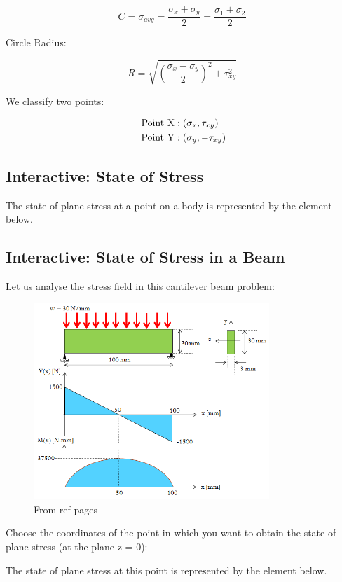 \[C = \sigma_{avg} = \frac{\sigma_x +\sigma_y}{2} = \frac{\sigma_1 +\sigma_2}{2}\]

\noindent Circle Radius:

\[R = \sqrt{(\frac{\sigma_x - \sigma_y}{2})^2 + \tau_{xy}^2}\]

\noindent We classify two points:

\[ \begin{align}
\rm\ Point \ X&: (\sigma_x, \tau_{xy}) \\
\rm\ Point \ Y&: (\sigma_y, -\tau_{xy})
\end{align}\]
                        
\subsection{Interactive: State of Stress}

The state of plane stress at a point on a body is represented by the element below.

\vspace{5pt}

\noindent \textbf{}

\subsection{Interactive: State of Stress in a Beam}

Let us analyse the stress field in this cantilever beam problem:

\begin{figure}[!h]
\centering
\includegraphics[angle=0, width=3.5in]{Stress Transformation-Figures/CantileverBeam.png}
\vspace{-2mm}
\caption{\small From ref pages}
\vspace{-3mm}
\label{Fig:CantileverBeam}
\end{figure}

\noindent Choose the coordinates of the point in which you want to obtain the state of plane stress (at the plane z = 0):

\vspace{5pt}

\noindent The state of plane stress at this point is represented by the element below.

\vspace{5pt}

\noindent \textbf{}